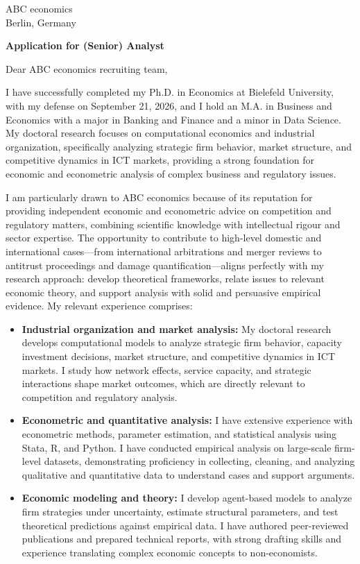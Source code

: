 \documentclass[11pt]{article}
\begin{document}
\vspace{0.1cm}

\noindent
ABC economics \\
Berlin, Germany

\vspace{0.12cm}

\noindent
\textbf{Application for (Senior) Analyst}

\vspace{0.1cm}

\noindent Dear ABC economics recruiting team,

I have successfully completed my Ph.D. in Economics at Bielefeld University, with my defense on September 21, 2026, 
and I hold an M.A. in Business and Economics with a major in Banking and Finance and a minor in Data Science. 
My doctoral research focuses on computational economics and industrial organization, 
specifically analyzing strategic firm behavior, market structure, and competitive dynamics in ICT markets, 
providing a strong foundation for economic and econometric analysis of complex business and regulatory issues.

I am particularly drawn to ABC economics because of its reputation for providing independent economic and econometric advice on competition and regulatory matters, combining scientific knowledge with intellectual rigour and sector expertise. 
The opportunity to contribute to high-level domestic and international cases—from international arbitrations and merger reviews to antitrust proceedings and damage quantification—aligns perfectly with my research approach: 
develop theoretical frameworks, relate issues to relevant economic theory, and support analysis with solid and persuasive empirical evidence.
My relevant experience comprises:

\begin{itemize}
    \item \textbf{Industrial organization and market analysis:} My doctoral research develops computational models to analyze strategic firm behavior, capacity investment decisions, market structure, and competitive dynamics in ICT markets. I study how network effects, service capacity, and strategic interactions shape market outcomes, which are directly relevant to competition and regulatory analysis.
    \item \textbf{Econometric and quantitative analysis:} I have extensive experience with econometric methods, parameter estimation, and statistical analysis using Stata, R, and Python. I have conducted empirical analysis on large-scale firm-level datasets, demonstrating proficiency in collecting, cleaning, and analyzing qualitative and quantitative data to understand cases and support arguments.
    \item \textbf{Economic modeling and theory:} I develop agent-based models to analyze firm strategies under uncertainty, estimate structural parameters, and test theoretical predictions against empirical data. I have authored peer-reviewed publications and prepared technical reports, with strong drafting skills and experience translating complex economic concepts to non-economists.
\end{itemize}
\end{document}
